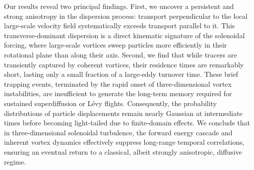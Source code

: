 \documentclass[]{article}
\begin{document}
Our results reveal two principal findings. First, we uncover a persistent and strong anisotropy in the dispersion process: transport perpendicular to the local large-scale velocity field systematically exceeds transport parallel to it. This transverse-dominant dispersion is a direct kinematic signature of the solenoidal forcing, where large-scale vortices sweep particles more efficiently in their rotational plane than along their axis. Second, we find that while tracers are transiently captured by coherent vortices, their residence times are remarkably short, lasting only a small fraction of a large-eddy turnover time. These brief trapping events, terminated by the rapid onset of three-dimensional vortex instabilities, are insufficient to generate the long-term memory required for sustained superdiffusion or Lévy flights. Consequently, the probability distributions of particle displacements remain nearly Gaussian at intermediate times before becoming light-tailed due to finite-domain effects. We conclude that in three-dimensional solenoidal turbulence, the forward energy cascade and inherent vortex dynamics effectively suppress long-range temporal correlations, ensuring an eventual return to a classical, albeit strongly anisotropic, diffusive regime.
\end{document}

